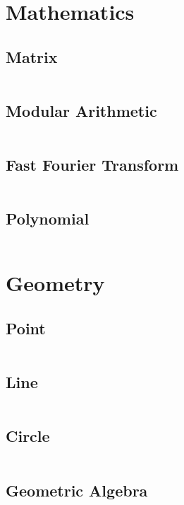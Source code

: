 \documentclass[11pt, a4paper]{amsart}
\begin{document}
	\section{Mathematics}
	\begin{multicols*}{2}
		\subsection{Matrix}
		\inputminted[firstline=3,lastline=46]{c++}{.code/maths/matrix.cpp}
		\vfill\null
		\columnbreak
		\subsection{Modular Arithmetic}
		\inputminted[firstline=3,lastline=24]{c++}{.code/maths/mod.cpp}
		\subsection{Fast Fourier Transform}
		\inputminted[firstline=3,lastline=13]{c++}{.code/maths/fft.cpp}
		\vfill\null
	\end{multicols*}
	\newpage
	\begin{multicols*}{2}
		\subsection{Polynomial}
		\inputminted[firstline=3,lastline=58]{c++}{.code/maths/polynomial.cpp}
		\vfill\null
		\columnbreak
		\vfill\null
	\end{multicols*}
	\newpage
	\section{Geometry}
	\begin{multicols*}{2}
		\subsection{Point}
		\inputminted[firstline=3,lastline=28]{c++}{.code/geometry/point.cpp}
		\subsection{Line}
		\inputminted[firstline=3,lastline=26]{c++}{.code/geometry/line.cpp}
		\vfill\null
		\columnbreak
		\subsection{Circle}
		\inputminted[firstline=3,lastline=48]{c++}{.code/geometry/circ.cpp}
		\vfill\null
	\end{multicols*}
	\newpage
	\begin{multicols*}{2}
		\subsection{Geometric Algebra}
		\inputminted[firstline=3,lastline=45]{c++}{.code/geometry/pga.cpp}
	\end{multicols*}
\end{document}
